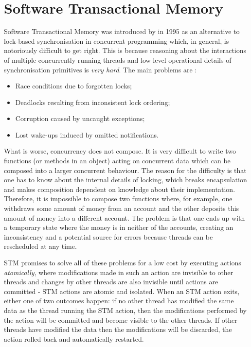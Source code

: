 \section{Software Transactional Memory}
Software Transactional Memory was introduced by \cite{shavit_software_1995} in 1995 as an alternative to lock-based synchronisation in concurrent programming which, in general, is notoriously difficult to get right. This is because reasoning about the interactions of multiple concurrently running threads and low level operational details of synchronisation primitives is \textit{very hard}. The main problems are \cite{marlow_parallel_2013}:

\begin{itemize}
	\item Race conditions due to forgotten locks;
	\item Deadlocks resulting from inconsistent lock ordering;
	\item Corruption caused by uncaught exceptions;
	\item Lost wake-ups induced by omitted notifications.
\end{itemize}

What is worse, concurrency does not compose. It is very difficult to write two functions (or methods in an object) acting on concurrent data which can be composed into a larger concurrent behaviour. The reason for the difficulty is that one has to know about the internal details of locking, which breaks encapsulation and makes composition dependent on knowledge about their implementation. Therefore, it is impossible to compose two functions where, for example, one withdraws some amount of money from an account and the other deposits this amount of money into a different account. The problem is that one ends up with a temporary state where the money is in neither of the accounts, creating an inconsistency and a potential source for errors because threads can be rescheduled at any time.

STM promises to solve all of these problems for a low cost by executing actions \textit{atomically}, where modifications made in such an action are invisible to other threads and changes by other threads are also invisible until actions are committed - STM actions are atomic and isolated. When an STM action exits, either one of two outcomes happen: if no other thread has modified the same data as the thread running the STM action, then the modifications performed by the action will be committed and become visible to the other threads. If other threads have modified the data then the modifications will be discarded, the action rolled back and automatically restarted.

